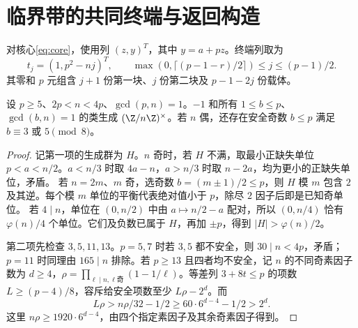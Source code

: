 \section{临界带的共同终端与返回构造}\label{sec:controllers}
对核心\eqref{eq:core}，使用列 $(z,y)^T$，其中 $y=a+pz$。终端列取为
\begin{equation}\label{eq:terminal}
t_j=(1,p^2-nj)^T,\qquad
\max(0,\lceil(p-1-r)/2\rceil)\le j\le(p-1)/2.
\end{equation}
其零和 $p$ 元组含 $j+1$ 份第一块、$j$ 份第二块及 $p-1-2j$ 份载体。

\begin{lemma}\label{lem:small-units}
设 $p\ge5$、$2p<n<4p$、$\gcd(p,n)=1$。$-1$ 和所有 $1\le b\le p$、$\gcd(b,n)=1$ 的类生成 $(\Z/n\Z)^\times$。若 $n$ 偶，还存在安全奇数 $b\le p$ 满足 $b\equiv3$ 或 $5\pmod8$。
\end{lemma}
\begin{proof}
记第一项的生成群为 $H$。$n$ 奇时，若 $H$ 不满，取最小正缺失单位 $p<a<n/2$。$a<n/3$ 时取 $4a-n$，$a>n/3$ 时取 $n-2a$，均为更小的正缺失单位，矛盾。
若 $n=2m$、$m$ 奇，选奇数 $b=(m\pm1)/2\le p$，则 $H$ 模 $m$ 包含 $2$ 及其逆。每个模 $m$ 单位的平衡代表绝对值小于 $p$，除尽 $2$ 因子后即是已知奇单位。
若 $4\mid n$，单位在 $(0,n/2)$ 中由 $a\mapsto n/2-a$ 配对，所以 $(0,n/4)$ 恰有 $\varphi(n)/4$ 个单位。它们及负数已属于 $H$，再加 $\pm p$，得到 $|H|>\varphi(n)/2$。

第二项先检查 $3,5,11,13$。$p=5,7$ 时若 $3,5$ 都不安全，则 $30\mid n<4p$，矛盾；$p=11$ 时同理由 $165\mid n$ 排除。若 $p\ge13$ 且四者均不安全，记 $n$ 的不同奇素因子数为 $d\ge4$，$\rho=\prod_{\ell\mid n,\ell\text{奇}}(1-1/\ell)$。等差列 $3+8t\le p$ 的项数 $L\ge(p-4)/8$，容斥给安全项数至少 $L\rho-2^d$。而
\[
L\rho>n\rho/32-1/2\ge60\cdot6^{d-4}-1/2>2^d.
\]
这里 $n\rho\ge1920\cdot6^{d-4}$，由四个指定素因子及其余奇素因子得到。
\end{proof}

